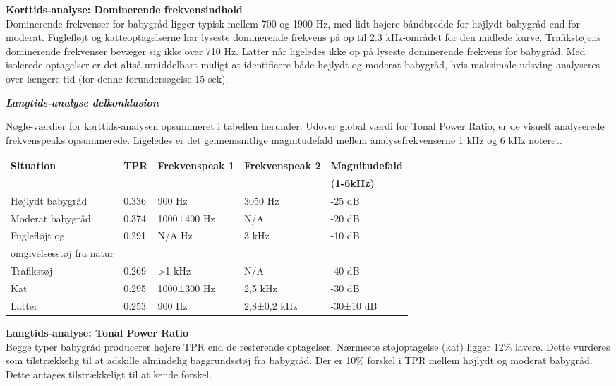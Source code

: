 \textbf{Korttids-analyse: Dominerende frekvensindhold}	\\
Dominerende frekvenser for babygråd ligger typisk mellem 700 og 1900 Hz, med lidt højere båndbredde for højlydt babygråd end for moderat. Fuglefløjt og katteoptagelserne har lyseste dominerende frekvens på op til 2.3 kHz-området for den midlede kurve. 
Trafikstøjens dominerende frekvenser bevæger sig ikke over 710 Hz. Latter når ligeledes ikke op på lyseste dominerende frekvens for babygråd. Med isolerede optagelser er det altså umiddelbart muligt at identificere både højlydt og moderat babygråd, hvis maksimale udsving analyseres over længere tid (for denne forundersøgelse 15 sek).

\newpage
\begin{center} \textit{\textbf{Langtids-analyse delkonklusion}} \end{center}
Nøgle-værdier for korttids-analysen opsummeret i tabellen herunder. Udover global værdi for Tonal Power Ratio, er de visuelt analyserede frekvenspeaks opsummerede. Ligeledes er det gennemsnitlige magnitudefald mellem analysefrekvenserne 1 kHz og 6 kHz noteret. 
\begin{center}
    \begin{tabular}{ | l | l | l | l | l |}
    \hline
    \textbf{Situation} 	& \textbf{TPR}  &\textbf{Frekvenspeak 1}	&\textbf{Frekvenspeak 2}	&\textbf{Magnitudefald} \\&&&&\textbf{(1-6kHz)}  	\\ \hline
    Højlydt babygråd 	& 0.336   				&900 Hz 				&3050 Hz				&-25 dB	\\ \hline
    Moderat babygråd 	& 0.374  				&1000±400 Hz 			&N/A					&-20 dB 	\\ \hline
    Fuglefløjt og 		& 0.291  				&N/A Hz 				&3 kHz					&-10 dB	\\ omgivelsesstøj fra natur & & & &	\\ \hline	
    Trafikstøj 			& 0.269  				&>1 kHz 				&N/A					&-40 dB	\\ \hline
    Kat 				& 0.295  				&1000±300 Hz			&2,5 kHz				&-30 dB	\\ \hline
    Latter 				& 0.253  				&900 Hz					&2,8±0,2 kHz			&-30±10 dB	\\ \hline
    \end{tabular}
\end{center}

\textbf{Langtids-analyse: Tonal Power Ratio}	\\
Begge typer babygråd producerer højere TPR end de resterende optagelser. Nærmeste støjoptagelse (kat) ligger  12\% lavere. Dette vurderes som tilstrækkelig til at adskille almindelig baggrundsstøj fra babygråd. Der er 10\% forskel i TPR mellem højlydt og moderat babygråd. Dette antages tilstrækkeligt til at kende forskel.

